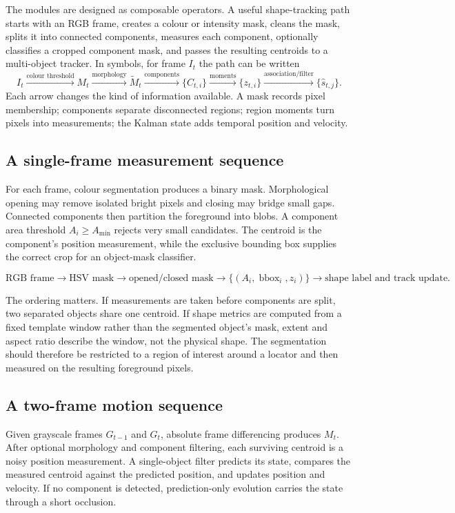 \documentclass[11pt,a4paper]{article}
\newcommand{\1}{\mathbf{1}}
\begin{document}
The modules are designed as composable operators. A useful shape-tracking path
starts with an RGB frame, creates a colour or intensity mask, cleans the mask,
splits it into connected components, measures each component, optionally
classifies a cropped component mask, and passes the resulting centroids to a
multi-object tracker. In symbols, for frame $I_t$ the path can be written
\[
 I_t\xrightarrow{\text{colour threshold}}M_t
 \xrightarrow{\text{morphology}}\widetilde M_t
 \xrightarrow{\text{components}}\{C_{t,i}\}
 \xrightarrow{\text{moments}}\{z_{t,i}\}
 \xrightarrow{\text{association/filter}}\{\hat s_{t,j}\}.
\]
Each arrow changes the kind of information available. A mask records
pixel membership; components separate disconnected regions; region moments
turn pixels into measurements; the Kalman state adds temporal position and
velocity.

\subsection{A single-frame measurement sequence}

For each frame, colour segmentation produces a binary mask. Morphological
opening may remove isolated bright pixels and closing may bridge small gaps.
Connected components then partition the foreground into blobs. A component
area threshold $A_i\ge A_{\min}$ rejects very small candidates. The centroid
is the component's position measurement, while the exclusive bounding box
supplies the correct crop for an object-mask classifier.

\[
 \text{RGB frame}\to\text{HSV mask}\to\text{opened/closed mask}\to
 \{(A_i,\operatorname{bbox}_i,z_i)\}\to\text{shape label and track update}.
\]

The ordering matters. If measurements are taken before components are split,
two separated objects share one centroid. If shape metrics are computed from a
fixed template window rather than the segmented object's mask, extent and
aspect ratio describe the window, not the physical shape. The segmentation
should therefore be restricted to a region of interest around a locator and
then measured on the resulting foreground pixels.

\subsection{A two-frame motion sequence}

Given grayscale frames $G_{t-1}$ and $G_t$, absolute frame differencing
produces $M_t$. After optional morphology and component filtering, each
surviving centroid is a noisy position measurement. A single-object filter
predicts its state, compares the measured centroid against the predicted
position, and updates position and velocity. If no component is detected,
prediction-only evolution carries the state through a short occlusion.
\end{document}
